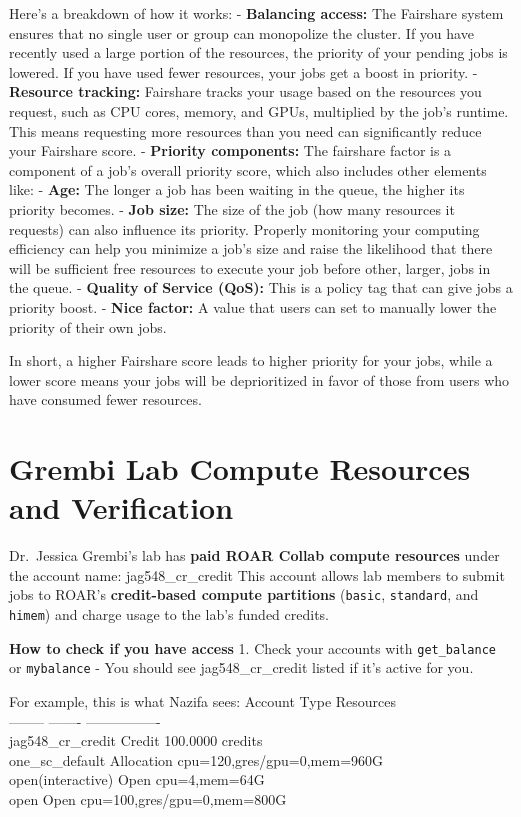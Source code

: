 \documentclass[
]{book}
\begin{document}
Here's a breakdown of how it works:
- \textbf{Balancing access:} The Fairshare system ensures that no single user or group can monopolize the cluster. If you have recently used a large portion of the resources, the priority of your pending jobs is lowered. If you have used fewer resources, your jobs get a boost in priority.
- \textbf{Resource tracking:} Fairshare tracks your usage based on the resources you request, such as CPU cores, memory, and GPUs, multiplied by the job's runtime. This means requesting more resources than you need can significantly reduce your Fairshare score.
- \textbf{Priority components:} The fairshare factor is a component of a job's overall priority score, which also includes other elements like:
- \textbf{Age:} The longer a job has been waiting in the queue, the higher its priority becomes.
- \textbf{Job size:} The size of the job (how many resources it requests) can also influence its priority. Properly monitoring your computing efficiency can help you minimize a job's size and raise the likelihood that there will be sufficient free resources to execute your job before other, larger, jobs in the queue.
- \textbf{Quality of Service (QoS):} This is a policy tag that can give jobs a priority boost.
- \textbf{Nice factor:} A value that users can set to manually lower the priority of their own jobs.

In short, a higher Fairshare score leads to higher priority for your jobs, while a lower score means your jobs will be deprioritized in favor of those from users who have consumed fewer resources.

\section{Grembi Lab Compute Resources and Verification}\label{grembi-lab-compute-resources-and-verification}

Dr.~Jessica Grembi's lab has \textbf{paid ROAR Collab compute resources} under the account name: jag548\_cr\_credit
This account allows lab members to submit jobs to ROAR's \textbf{credit-based compute partitions} (\texttt{basic}, \texttt{standard}, and \texttt{himem}) and charge usage to the lab's funded credits.

\textbf{How to check if you have access}
1. Check your accounts with \texttt{get\_balance} or \texttt{mybalance}
- You should see jag548\_cr\_credit listed if it's active for you.

For example, this is what Nazifa sees:
Account Type Resources\\
-------- ------- ----------------\\
jag548\_cr\_credit Credit 100.0000 credits\\
one\_sc\_default Allocation cpu=120,gres/gpu=0,mem=960G\\
open(interactive) Open cpu=4,mem=64G\\
open Open cpu=100,gres/gpu=0,mem=800G
\end{document}
